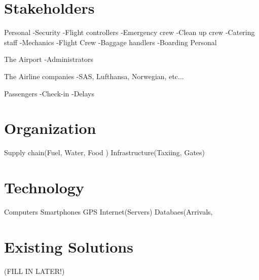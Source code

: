 \section{Stakeholders} 
\label{Stakeholders}

Personal
	-Security
	-Flight controllers
	-Emergency crew
	-Clean up crew
	-Catering staff
	-Mechanics
	-Flight Crew
	-Baggage handlers
	-Boarding Personal
	
The Airport
	-Administrators

The Airline companies
	-SAS, Lufthansa, Norwegian, etc...
	
Passengers
	-Check-in
	-Delays
		
\section{Organization}
\label{Organization}
Supply chain(Fuel, Water, Food )	
Infrastructure(Taxiing, Gates)

	
\section{Technology}
\label{Technology}
Computers
Smartphones
GPS
Internet(Servers)
Databaes(Arrivals, 

\section{Existing Solutions}
\label{Existing Solutions}
(FILL IN LATER!)